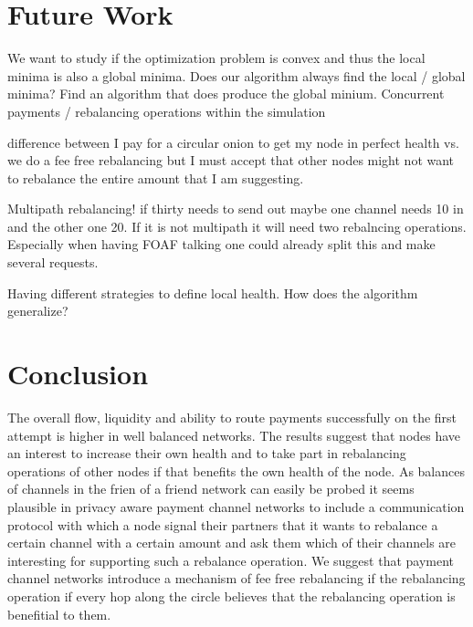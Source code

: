 \documentclass[a4paper]{paper}
\begin{document}


\section{Future Work}
We want to study if the optimization problem is convex and thus the local minima is also a global minima.
Does our algorithm always find the local / global minima?
Find an algorithm that does produce the global minium.
Concurrent payments / rebalancing operations within the simulation

difference between I pay for a circular onion to get my node in perfect health vs. we do a fee free rebalancing but I must accept that other nodes might not want to rebalance the entire amount that I am suggesting.

Multipath rebalancing! if thirty needs to send out maybe one channel needs 10 in and the other one 20. If it is not multipath it will need two rebalncing operations. Especially when having FOAF talking one could already split this and make several requests.

Having different strategies to define local health. How does the algorithm generalize? 

\section{Conclusion}
The overall flow, liquidity and ability to route payments successfully on the first attempt is higher in well balanced networks. 
The results suggest that nodes have an interest to increase their own health and to take part in rebalancing operations of other nodes if that benefits the own health of the node.
As balances of channels in the frien of a friend network can easily be probed it seems plausible in privacy aware payment channel networks to include a communication protocol with which a node signal their partners that it wants to rebalance a certain channel with a certain amount and ask them which of their channels are interesting for supporting such a rebalance operation.
We suggest that payment channel networks introduce a mechanism of fee free rebalancing if the rebalancing operation if every hop along the circle believes that the rebalancing operation is benefitial to them. 




\end{document}
